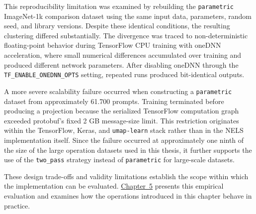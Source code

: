 This reproducibility limitation was examined by rebuilding the \texttt{parametric} ImageNet-1k comparison dataset using the same input data, parameters, random seed, and library versions. Despite these identical conditions, the resulting clustering differed substantially. The divergence was traced to non-deterministic floating-point behavior during TensorFlow CPU training with oneDNN acceleration, where small numerical differences accumulated over training and produced different network parameters. After disabling oneDNN through the \texttt{TF\_ENABLE\_ONEDNN\_OPTS} setting, repeated runs produced bit-identical outputs.

A more severe scalability failure occurred when constructing a \texttt{parametric} dataset from approximately 61.700 prompts. Training terminated before producing a projection because the serialized TensorFlow computation graph exceeded protobuf's fixed 2 GB message-size limit. This restriction originates within the TensorFlow, Keras, and \texttt{umap-learn} stack rather than in the NELS implementation itself. Since the failure occurred at approximately one ninth of the size of the large operation datasets used in this thesis, it further supports the use of the \texttt{two\_pass} strategy instead of \texttt{parametric} for large-scale datasets.

These design trade-offs and validity limitations establish the scope within which the implementation can be evaluated. \hyperref[ch:results]{Chapter~5} presents this empirical evaluation and examines how the operations introduced in this chapter behave in practice.
